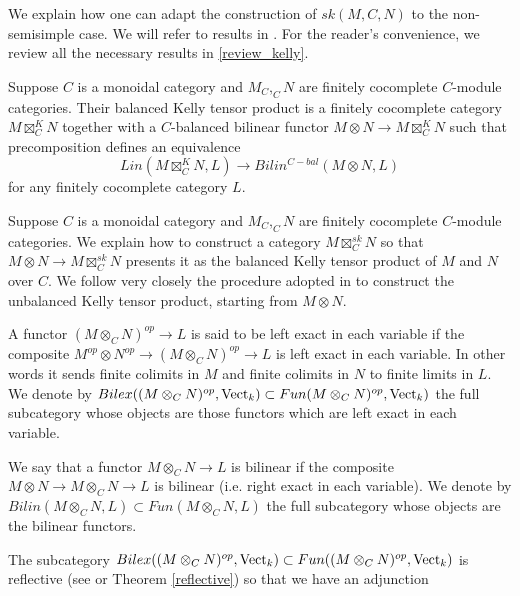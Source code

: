 We explain how one can adapt the construction of $sk(M,C,N)$ to the non-semisimple case. We will refer to results in \cite{kelly/basic-concepts-enriched}. For the reader's convenience, we review all the necessary results in \ref{review_kelly}.

\begin{definition}
Suppose $C$ is a monoidal category and $M_C, _{C}N$ are finitely cocomplete $C$-module categories. Their balanced Kelly tensor product is a finitely cocomplete category $M\boxtimes^K_C N$ together with a $C$-balanced bilinear functor $M\otimes N\to M\boxtimes^K_C N$ such that precomposition defines an equivalence $$Lin(M\boxtimes^K_C N,L)\to Bilin^{C-bal}(M\otimes N, L)$$ for any finitely cocomplete category $L$.\end{definition}

Suppose $C$ is a monoidal category and $M_C, _{C}N$ are finitely cocomplete $C$-module categories. We explain how to construct a category $M\boxtimes_C^{sk}N$ so that $M\otimes N\to M\boxtimes_C^{sk}N$ presents it as the balanced Kelly tensor product of $M$ and $N$ over $C$. We follow very closely the procedure adopted in \cite{lopezfranco/tensor-products} to construct the unbalanced Kelly tensor product, starting from $M\otimes N$.

\begin{definition}

A functor $(M\otimes_C N)^{op}\to L$ is said to be left exact in each variable if the composite $M^{op}\otimes N^{op}\to (M\otimes_C N)^{op}\to L$ is left exact in each variable. In other words it sends finite colimits in $M$ and finite colimits in $N$ to finite limits in $L$. We denote by $Bilex((M\otimes_C N)^{op},\operatorname{Vect}_k)\subset Fun(M\otimes_C N)^{op},\operatorname{Vect}_k)$ the full subcategory whose objects are those functors which are left exact in each variable.
\end{definition}


\begin{definition}
We say that a functor $M\otimes_C N \to L$ is bilinear if the composite $M\otimes N\to M\otimes_C N \to L$ is bilinear (i.e. right exact in each variable). We denote by $Bilin(M\otimes_C N, L)\subset Fun(M\otimes_C N, L)$ the full subcategory whose objects are the bilinear functors. \end{definition}


The subcategory $Bilex((M\otimes_C N)^{op},\operatorname{Vect}_k)\subset Fun((M\otimes_C N)^{op},\operatorname{Vect}_k)$ is reflective (see \cite[Theorem 6.5]{kelly/basic-concepts-enriched} or Theorem \ref{reflective}) so that we have an adjunction

